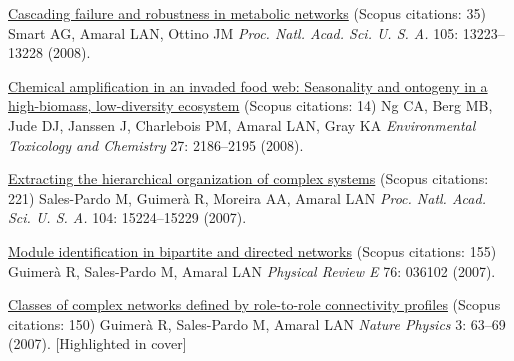 \NumberedItem{\makebox[0.8cm][r]{[75]}}
\href{/people/amaral/cascading-failure-and-robustness-in-metabolic-networks}
{Cascading failure and robustness in metabolic networks}
    (Scopus citations: 35)
\newline
Smart AG, Amaral LAN, Ottino JM
\newline
\textit{Proc. Natl. Acad. Sci. U. S. A.}
    105:
13223--13228 (2008).
\newline
\Gap
~
\Gap

\NumberedItem{\makebox[0.8cm][r]{[74]}}
\href{/people/amaral/chemical-amplification-in-an-invaded-food-web-seasonality-and-ontogeny-in-a-high-biomass-low-diversity-ecosystem}
{Chemical amplification in an invaded food web: Seasonality and ontogeny in a high-biomass, low-diversity ecosystem}
    (Scopus citations: 14)
\newline
Ng CA, Berg MB, Jude DJ, Janssen J, Charlebois PM, Amaral LAN, Gray KA
\newline
\textit{Environmental Toxicology and Chemistry}
    27:
2186--2195 (2008).
\newline
\Gap
~
\Gap

\NumberedItem{\makebox[0.8cm][r]{[73]}}
\href{/people/amaral/extracting-the-hierarchical-organization-of-complex-systems}
{Extracting the hierarchical organization of complex systems}
    (Scopus citations: 221)
\newline
Sales-Pardo M, Guimer\`a R, Moreira AA, Amaral LAN
\newline
\textit{Proc. Natl. Acad. Sci. U. S. A.}
    104:
15224--15229 (2007).
\newline
\Gap
~
\Gap

\NumberedItem{\makebox[0.8cm][r]{[72]}}
\href{/people/amaral/module-identification-in-bipartite-and-directed-networks}
{Module identification in bipartite and directed networks}
    (Scopus citations: 155)
\newline
Guimer\`a R, Sales-Pardo M, Amaral LAN
\newline
\textit{Physical Review E}
    76:
036102 (2007).
\newline
\Gap
~
\Gap

\NumberedItem{\makebox[0.8cm][r]{[71]}}
\href{/people/amaral/classes-of-complex-networks-defined-by-role-to-role-connectivity-profiles}
{Classes of complex networks defined by role-to-role connectivity profiles}
    (Scopus citations: 150)
\newline
Guimer\`a R, Sales-Pardo M, Amaral LAN
\newline
\textit{Nature Physics}
    3:
63--69 (2007).
    [Highlighted in cover]
\newline
\Gap
~
\Gap

